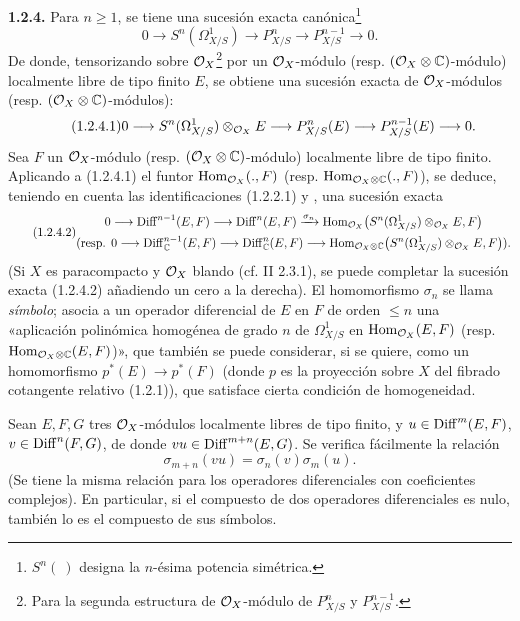\textbf{1.2.4.} Para $n\ge1$, se tiene una sucesión exacta canónica\footnote{$S^n(\ )$ designa la $n$-ésima potencia simétrica.}
\[
 0\longrightarrow S^n(\Omega^1_{X/S})
 \longrightarrow P^n_{X/S}
 \longrightarrow P^{n-1}_{X/S}
 \longrightarrow 0.
\]
De donde, tensorizando sobre $\mathcal O_X$\footnote{Para la segunda estructura de $\mathcal O_X$-módulo de $P^n_{X/S}$ y $P^{n-1}_{X/S}$.} por un $\mathcal O_X$-módulo (resp. $(\mathcal O_X\otimes\mathbb C)$-módulo) localmente libre de tipo finito $E$, se obtiene una sucesión exacta de $\mathcal O_X$-módulos (resp. $(\mathcal O_X\otimes\mathbb C)$-módulos):
\begin{equation}\tag{1.2.4.1}
 0\longrightarrow S^n(\Omega^1_{X/S})\otimes_{\mathcal O_X}E
 \longrightarrow P^n_{X/S}(E)
 \longrightarrow P^{n-1}_{X/S}(E)
 \longrightarrow 0.
\end{equation}
Sea $F$ un $\mathcal O_X$-módulo (resp. $(\mathcal O_X\otimes\mathbb C)$-módulo) localmente libre de tipo finito. Aplicando a (1.2.4.1) el funtor $\operatorname{Hom}_{\mathcal O_X}(.,F)$ (resp. $\operatorname{Hom}_{\mathcal O_X\otimes\mathbb C}(.,F)$), se deduce, teniendo en cuenta las identificaciones (1.2.2.1) y , una sucesión exacta
\begin{equation}\tag{1.2.4.2}
\begin{gathered}
 0\longrightarrow \operatorname{Diff}^{n-1}(E,F)
 \longrightarrow \operatorname{Diff}^n(E,F)
 \xrightarrow{\sigma_n}
 \operatorname{Hom}_{\mathcal O_X}\bigl(S^n(\Omega^1_{X/S})\otimes_{\mathcal O_X}E,F\bigr)\\
 (\text{resp. } 0\longrightarrow \operatorname{Diff}^{n-1}_\mathbb C(E,F)
 \longrightarrow \operatorname{Diff}^n_\mathbb C(E,F)
 \longrightarrow
 \operatorname{Hom}_{\mathcal O_X\otimes\mathbb C}\bigl(S^n(\Omega^1_{X/S})\otimes_{\mathcal O_X}E,F\bigr)).
\end{gathered}
\end{equation}
(Si $X$ es paracompacto y $\mathcal O_X$ blando (cf. II 2.3.1), se puede completar la sucesión exacta (1.2.4.2) añadiendo un cero a la derecha). El homomorfismo $\sigma_n$ se llama \emph{símbolo}; asocia a un operador diferencial de $E$ en $F$ de orden $\le n$ una «aplicación polinómica homogénea de grado $n$ de $\Omega^1_{X/S}$ en $\operatorname{Hom}_{\mathcal O_X}(E,F)$ (resp. $\operatorname{Hom}_{\mathcal O_X\otimes\mathbb C}(E,F)$)», que también se puede considerar, si se quiere, como un homomorfismo $p^*(E)\longrightarrow p^*(F)$ (donde $p$ es la proyección sobre $X$ del fibrado cotangente relativo (1.2.1)), que satisface cierta condición de homogeneidad.

Sean $E,F,G$ tres $\mathcal O_X$-módulos localmente libres de tipo finito, y $u\in\operatorname{Diff}^m(E,F)$, $v\in\operatorname{Diff}^n(F,G)$, de donde $vu\in\operatorname{Diff}^{m+n}(E,G)$. Se verifica fácilmente la relación
\begin{equation}\tag{1.2.4.3}
 \sigma_{m+n}(vu)=\sigma_n(v)\sigma_m(u).
\end{equation}
(Se tiene la misma relación para los operadores diferenciales con coeficientes complejos). En particular, si el compuesto de dos operadores diferenciales es nulo, también lo es el compuesto de sus símbolos.
